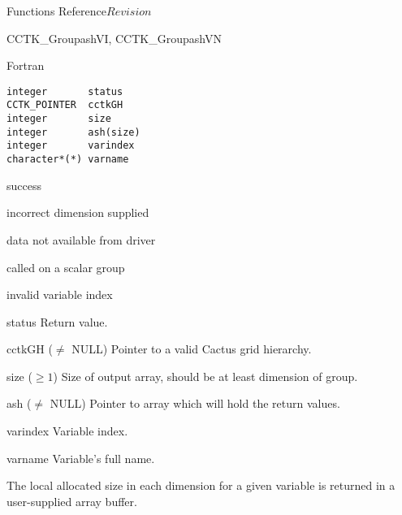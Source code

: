 \begin{cactuspart}{ Functions Reference}{}{$Revision$}
\begin{FunctionDescription}{CCTK\_GroupashVI, CCTK\_GroupashVN}
\begin{SynopsisSection}
\begin{Synopsis}{Fortran}
\begin{verbatim}
integer       status
CCTK_POINTER  cctkGH
integer       size
integer       ash(size)
integer       varindex
character*(*) varname
\end{verbatim}
\end{Synopsis}
\end{SynopsisSection}

\begin{ResultSection}
\begin{Result}{0} success \end{Result}
\begin{Result}{-1} incorrect dimension supplied \end{Result}
\begin{Result}{-2} data not available from driver \end{Result}
\begin{Result}{-3} called on a scalar group \end{Result}
\begin{Result}{-4} invalid variable index \end{Result}
\end{ResultSection}

\begin{ParameterSection}
\begin{Parameter}{status} Return value. \end{Parameter}
\begin{Parameter}{cctkGH ($\ne$ NULL)} Pointer to a valid Cactus grid hierarchy. \end{Parameter}
\begin{Parameter}{size ($\ge 1$)} Size of output array, should be at
least dimension of group. \end{Parameter}
\begin{Parameter}{ash ($\ne$ NULL)} Pointer to array which will hold the return values. \end{Parameter}
\begin{Parameter}{varindex} Variable index. \end{Parameter}
\begin{Parameter}{varname} Variable's full name. \end{Parameter}
\end{ParameterSection}

\begin{Discussion}
The local allocated size in each dimension for a given variable is returned in a user-supplied array buffer.
\end{Discussion}


\end{FunctionDescription}
\end{cactuspart}
